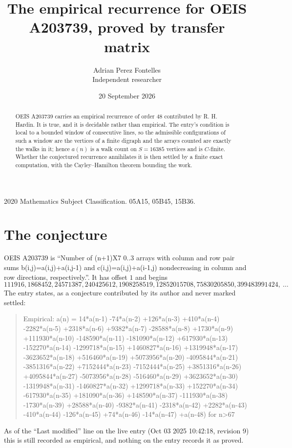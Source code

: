 \documentclass[11pt,a4paper]{article}
\title{The empirical recurrence for OEIS A203739, proved by transfer matrix}
\author{Adrian Perez Fontelles\\ \small Independent researcher}
\date{20 September 2026}
\theoremstyle{plain}
\theoremstyle{definition}
\begin{document}
\maketitle

\begin{abstract}
OEIS A203739 carries an empirical recurrence of order $48$ contributed by R. H. Hardin. It is
true, and it is decidable rather than empirical. The entry's condition is local to a bounded window of consecutive lines, so
the admissible configurations of such a window are the vertices of a finite digraph and the
arrays counted are exactly the walks in it; hence $a(n)$ is a walk count on $S=16385$ vertices
and is $C$-finite. Whether the conjectured recurrence annihilates it is then settled by a
finite exact computation, with the Cayley--Hamilton theorem bounding the work.
\end{abstract}

\noindent\small 2020 Mathematics Subject Classification. 05A15, 05B45, 15B36.\normalsize

\section{The conjecture}

OEIS A203739 is ``Number of (n+1)X7 0..3 arrays with column and row pair sums b(i,j)=a(i,j)+a(i,j-1) and c(i,j)=a(i,j)+a(i-1,j) nondecreasing in column and row directions, respectively.''. It has offset $1$ and begins
\[
111916, 1868452, 24571387, 240425612, 1908258519, 12852015708, 75830205850, 399483991424,\ \dots
\]
The entry states, as a conjecture contributed by its author and never marked settled:
\begin{quote}\raggedright\small
Empirical: a(n) = 14*a(n-1) -74*a(n-2) +126*a(n-3) +410*a(n-4) -2282*a(n-5) +2318*a(n-6) +9382*a(n-7) -28588*a(n-8) +1730*a(n-9) +111930*a(n-10) -148590*a(n-11) -181090*a(n-12) +617930*a(n-13) -152270*a(n-14) -1299718*a(n-15) +1460827*a(n-16) +1319948*a(n-17) -3623652*a(n-18) +516460*a(n-19) +5073956*a(n-20) -4095844*a(n-21) -3851316*a(n-22) +7152444*a(n-23) -7152444*a(n-25) +3851316*a(n-26) +4095844*a(n-27) -5073956*a(n-28) -516460*a(n-29) +3623652*a(n-30) -1319948*a(n-31) -1460827*a(n-32) +1299718*a(n-33) +152270*a(n-34) -617930*a(n-35) +181090*a(n-36) +148590*a(n-37) -111930*a(n-38) -1730*a(n-39) +28588*a(n-40) -9382*a(n-41) -2318*a(n-42) +2282*a(n-43) -410*a(n-44) -126*a(n-45) +74*a(n-46) -14*a(n-47) +a(n-48) for n>67
\end{quote}
As of the ``Last modified'' line on the live entry (Oct 03 2025 10:42:18, revision 9) this is still
recorded as empirical, and nothing on the entry records it as proved.
\end{document}
